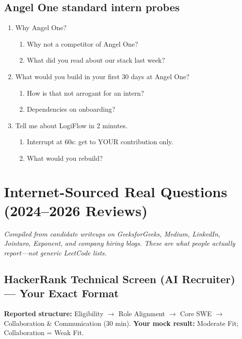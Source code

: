 \documentclass[9pt,a4paper]{article}
\begin{document}
\subsection{Angel One standard intern probes}
\begin{enumerate}[label=\textbf{Q\arabic*:}, leftmargin=*]
  \item Why Angel One?
  \begin{enumerate}[label=\textit{FU\arabic*:}, leftmargin=2em]
    \item Why not a competitor of Angel One?
    \item What did you read about our stack last week?
  \end{enumerate}
  \item What would you build in your first 30 days at Angel One?
  \begin{enumerate}[label=\textit{FU\arabic*:}, leftmargin=2em]
    \item How is that not arrogant for an intern?
    \item Dependencies on onboarding?
  \end{enumerate}
  \item Tell me about LogiFlow in 2 minutes.
  \begin{enumerate}[label=\textit{FU\arabic*:}, leftmargin=2em]
    \item Interrupt at 60s: get to YOUR contribution only.
    \item What would you rebuild?
  \end{enumerate}
\end{enumerate}
\newpage

\newpage
\section{Internet-Sourced Real Questions (2024--2026 Reviews)}
\textit{Compiled from candidate writeups on GeeksforGeeks, Medium, LinkedIn, Jointaro, Exponent, and company hiring blogs. These are what people actually report---not generic LeetCode lists.}

\subsection{HackerRank Technical Screen (AI Recruiter) --- Your Exact Format}
\textbf{Reported structure:} Eligibility $\rightarrow$ Role Alignment $\rightarrow$ Core SWE $\rightarrow$ Collaboration \& Communication (30 min). \textbf{Your mock result:} Moderate Fit; Collaboration = Weak Fit.
\end{document}
